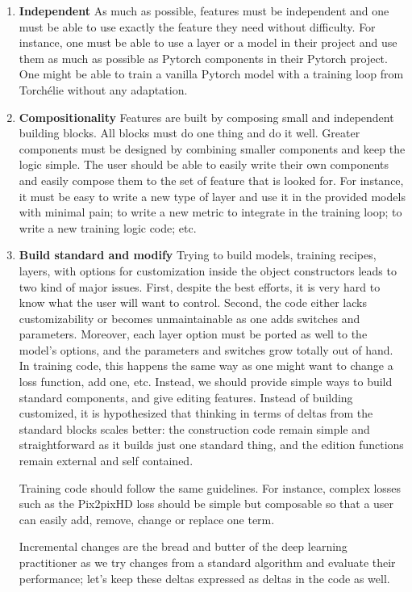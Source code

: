 \begin{enumerate}
    \item \textbf{Independent} As much as possible, features must be independent and one must be able to use exactly the feature they need without difficulty. For instance, one must be able to use a layer or a model in their project and use them as much as possible as Pytorch components in their Pytorch project. One might be able to train a vanilla Pytorch model with a training loop from Torchélie without any adaptation.
    
    \item \textbf{Compositionality} Features are built by composing small and independent building blocks. All blocks must do one thing and do it well. Greater components must be designed by combining smaller components and keep the logic simple. The user should be able to easily write their own components and easily compose them to the set of feature that is looked for. For instance, it must be easy to write a new type of layer and use it in the provided models with minimal pain; to write a new metric to integrate in the training loop; to write a new training logic code; etc.
    
    \item \textbf{Build standard and modify} Trying to build models, training recipes, layers, with options for customization inside the object constructors leads to two kind of major issues. First, despite the best efforts, it is very hard to know what the user will want to control. Second, the code either lacks customizability or becomes unmaintainable as one adds switches and parameters. Moreover, each layer option must be ported as well to the model's options, and the parameters and switches grow totally out of hand. In training code, this happens the same way as one might want to change a loss function, add one, etc. Instead, we should provide simple ways to build standard components, and give editing features. Instead of building customized, it is hypothesized that thinking in terms of deltas from the standard blocks scales better: the construction code remain simple and straightforward as it builds just one standard thing, and the edition functions remain external and self contained.
    
    Training code should follow the same guidelines. For instance, complex losses such as the Pix2pixHD loss should be simple but composable so that a user can easily add, remove, change or replace one term.
    
    Incremental changes are the bread and butter of the deep learning practitioner as we try changes from a standard algorithm and evaluate their performance; let's keep these deltas expressed as deltas in the code as well.
\end{enumerate}

